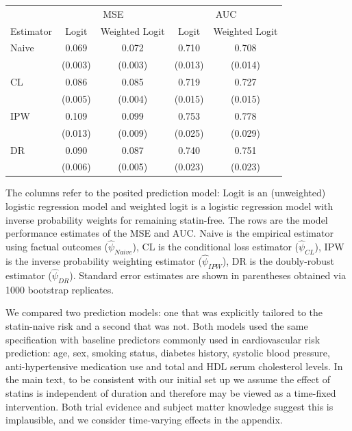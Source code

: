 \begin{table}[t]
    \begin{threeparttable}
        \begin{tabular}{lcccc}
        \toprule
        \multicolumn{1}{c}{ } & \multicolumn{2}{c}{MSE} & \multicolumn{2}{c}{AUC} \\
        \cmidrule(l{3pt}r{3pt}){2-3} \cmidrule(l{3pt}r{3pt}){4-5}
        Estimator & Logit & Weighted Logit & Logit & Weighted Logit\\
        \midrule
        Naive & 0.069 & 0.072 & 0.710 & 0.708\\
         & (0.003) & (0.003) & (0.013) & (0.014)\\
        CL & 0.086 & 0.085 & 0.719 & 0.727\\
         & (0.005) & (0.004) & (0.015) & (0.015)\\
        IPW & 0.109 & 0.099 & 0.753 & 0.778\\
         & (0.013) & (0.009) & (0.025) & (0.029)\\
        DR & 0.090 & 0.087 & 0.740 & 0.751\\
         & (0.006) & (0.005) & (0.023) & (0.023)\\
        \bottomrule
        \end{tabular}
        \centering
        \begin{tablenotes}[flushleft]
        \item The columns refer to the posited prediction model: Logit is an (unweighted) logistic regression model and weighted logit is a logistic regression model with inverse probability weights for remaining statin-free. The rows are the model performance estimates of the MSE and AUC. Naive is the empirical estimator using factual outcomes ($\widehat{\psi}_{Naive}$), CL is the conditional loss estimator ($\widehat{\psi}_{CL}$), IPW is the inverse probability weighting estimator ($\widehat{\psi}_{IPW}$), DR is the doubly-robust estimator ($\widehat{\psi}_{DR}$). Standard error estimates are shown in parentheses obtained via 1000 bootstrap replicates.
        \end{tablenotes}
        \end{threeparttable}
\end{table}

We compared two prediction models: one that was explicitly tailored to the statin-naive risk and a second that was not. Both models used the same specification with baseline predictors commonly used in cardiovascular risk prediction: age, sex, smoking status, diabetes history, systolic blood pressure, anti-hypertensive medication use and total and HDL serum cholesterol levels. In the main text, to be consistent with our initial set up we assume the effect of statins is independent of duration and therefore may be viewed as a time-fixed intervention. Both trial evidence and subject matter knowledge suggest this is implausible, and we consider time-varying effects in the appendix.

